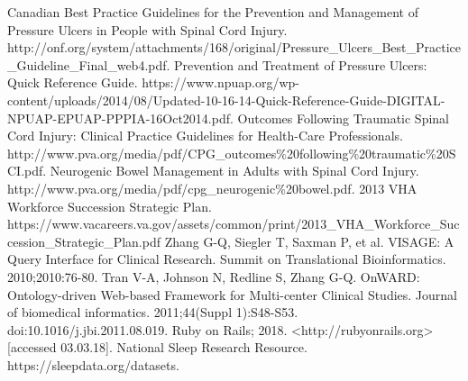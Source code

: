 \documentclass{amia}
\begin{document}
{\begin{thebibliography}{1}
Canadian Best Practice Guidelines for the Prevention and Management of Pressure Ulcers in People with Spinal Cord Injury. http://onf.org/system/attachments/168/original/Pressure\_Ulcers\_Best\_Practice\_Guideline\_Final\_web4.pdf.
Prevention and Treatment of Pressure Ulcers: Quick Reference Guide. https://www.npuap.org/wp-content/uploads/2014/08/Updated-10-16-14-Quick-Reference-Guide-DIGITAL-NPUAP-EPUAP-PPPIA-16Oct2014.pdf.
Outcomes Following Traumatic Spinal Cord Injury: Clinical Practice Guidelines for Health-Care Professionals. http://www.pva.org/media/pdf/CPG\_outcomes\%20following\%20traumatic\%20SCI.pdf.
Neurogenic Bowel Management in Adults with Spinal Cord Injury. http://www.pva.org/media/pdf/cpg\_neurogenic\%20bowel.pdf.
2013 VHA Workforce Succession Strategic Plan. https://www.vacareers.va.gov/assets/common/print/2013\_VHA\_Workforce\_Succession\_Strategic\_Plan.pdf
Zhang G-Q, Siegler T, Saxman P, et al. VISAGE: A Query Interface for Clinical Research. Summit on Translational Bioinformatics. 2010;2010:76-80.
Tran V-A, Johnson N, Redline S, Zhang G-Q. OnWARD: Ontology-driven Web-based Framework for Multi-center Clinical Studies. Journal of biomedical informatics. 2011;44(Suppl 1):S48-S53. doi:10.1016/j.jbi.2011.08.019.
Ruby on Rails; 2018. <http://rubyonrails.org> [accessed 03.03.18].
National Sleep Research Resource. https://sleepdata.org/datasets.


\end{thebibliography}
}
\end{document}
